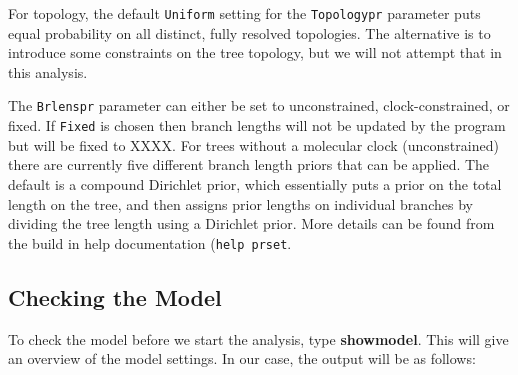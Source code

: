 \documentclass[12pt]{book}
\begin{document}
For topology, the default \texttt{Uniform} setting for the \texttt{Topologypr} parameter puts equal
 probability on all distinct, fully resolved topologies. The alternative is to introduce some constraints
 on the tree topology, but we will not attempt that in this analysis.

The \texttt{Brlenspr} parameter can either be set to unconstrained, clock-constrained, or fixed. If 
 \texttt{Fixed} is chosen then branch lengths will not be updated by the program but will be fixed
 to XXXX.
 For trees without a molecular clock (unconstrained) there are currently five different branch length
 priors that can be applied. The default is a compound Dirichlet prior, which essentially puts a
 prior on the total length on the tree, and then assigns prior lengths on individual branches by
 dividing the tree length using a Dirichlet prior. More details can be found from the build in
 help documentation (\texttt{help prset}.
 

\subsection{Checking the Model}

To check the model before we start the analysis, type \textbf{showmodel}. This will give an overview of the
 model settings. In our case, the output will be as follows:
\end{document}
